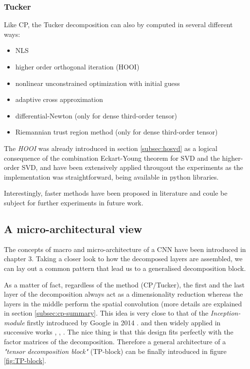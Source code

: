 \subsubsection{Tucker}
Like CP, the Tucker decomposition can also by computed in several different ways: 
\begin{itemize}
    \item NLS
    
    \item higher order orthogonal iteration (HOOI)

    \item nonlinear unconstrained optimization with initial guess
    
    \item adaptive cross approximation 
        
    \item differential-Newton (only for dense third-order tensor) 
    
    \item Riemannian trust region method (only for dense third-order tensor) 
\end{itemize}

The \emph{HOOI} was already introduced in section \ref{subsec:hosvd} as a logical consequence of the combination Eckart-Young theorem for SVD and the higher-order SVD, and have been extensively applied througout the experiments as the implementation was straightforward, being available in python libraries. 
\newline 

Interestingly, faster methods have been proposed in literature \parencite{tucker-fast1} \parencite{tucker-fast2} and coule be subject for further experiments in future work.

\newpage 
\subsection{A micro-architectural view}
The concepts of macro and micro-architecture of a CNN have been introduced in chapter 3. Taking a closer look to how the decomposed layers are assembled, we can lay out a common pattern that lead us to a generalised decomposition block. 
\newline 

As a matter of fact, regardless of the method (CP/Tucker), the first and the last layer of the decomposition always act as a dimensionality reduction whereas the layers in the middle perform the spatial convolution (more details are explained in section \ref{subsec:cp-summary}. This idea is very close to that of the \emph{Inception-module} firstly introduced by Google in 2014 \parencite{googlenet}. and then widely applied in successive works \parencite{squeeznet}, \parencite{chollet}, \parencite{mobilenets}.  
\newline
The nice thing is that this design fits perfectly with the factor matrices of the decomposition.  
Therefore a general architecture of a \emph{"tensor decomposition block"} (TP-block) can be finally introduced in figure \ref{fig:TP-block}.

